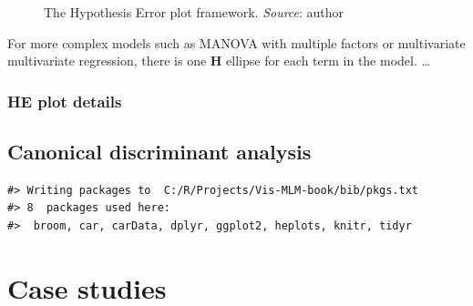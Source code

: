 \documentclass[
  letterpaper,
  10pt,
  krantz2]{krantz}
\begin{document}
{\begin{figure}


\caption{\label{fig-HE-framework}The Hypothesis Error plot framework.
\emph{Source}: author}

\end{figure}%

For more complex models such as MANOVA with multiple factors or
multivariate multivariate regression, there is one \(\mathbf{H}\)
ellipse for each term in the model. \ldots{}

\subsection{HE plot details}\label{he-plot-details}

\section{Canonical discriminant analysis}\label{sec-candisc}

\begin{verbatim}
#> Writing packages to  C:/R/Projects/Vis-MLM-book/bib/pkgs.txt
#> 8  packages used here:
#>  broom, car, carData, dplyr, ggplot2, heplots, knitr, tidyr
\end{verbatim}


\chapter{Case studies}\label{case-studies}

}
\end{document}

